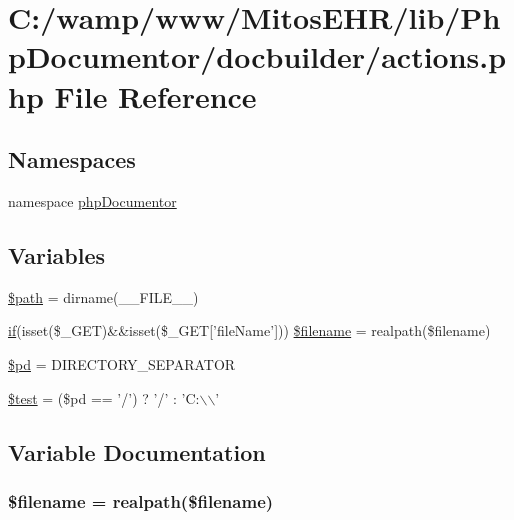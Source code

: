 \hypertarget{actions_8php}{\section{\-C\-:/wamp/www/\-Mitos\-E\-H\-R/lib/\-Php\-Documentor/docbuilder/actions.php \-File \-Reference}
\label{actions_8php}
}
\subsection*{\-Namespaces}
\begin{DoxyCompactItemize}
\item 
namespace \hyperlink{namespacephp_documentor}{php\-Documentor}
\end{DoxyCompactItemize}
\subsection*{\-Variables}
\begin{DoxyCompactItemize}
\item 
\hyperlink{actions_8php_a0a4baf0b22973c07685c3981f0d17fc4}{\$path} = dirname(\-\_\-\-\_\-\-F\-I\-L\-E\-\_\-\-\_\-)
\item 
\hyperlink{_setup_8inc_8php_ad0184337b31d13763ec8751feff4aabe}{if}(isset(\$\-\_\-\-G\-E\-T)\&\&isset(\$\-\_\-\-G\-E\-T\mbox{[}'file\-Name'\mbox{]})) \hyperlink{actions_8php_a6b7de8d10c540db2f1631e68b2aa0538}{\$filename} = realpath(\$filename)
\item 
\hyperlink{actions_8php_a0504ca5eae7aa6afd25cce9724b68ec6}{\$pd} = \-D\-I\-R\-E\-C\-T\-O\-R\-Y\-\_\-\-S\-E\-P\-A\-R\-A\-T\-O\-R
\item 
\hyperlink{actions_8php_a31daebf88fc668f410293e2c70cea3fc}{\$test} = (\$pd == '/') ? '/' \-: '\-C\-:$\backslash$$\backslash$'
\end{DoxyCompactItemize}


\subsection{\-Variable \-Documentation}
\hypertarget{actions_8php_a6b7de8d10c540db2f1631e68b2aa0538}{
\subsubsection[{\$filename}]{ \$filename = realpath(\$filename)}}\label{actions_8php_a6b7de8d10c540db2f1631e68b2aa0538}


